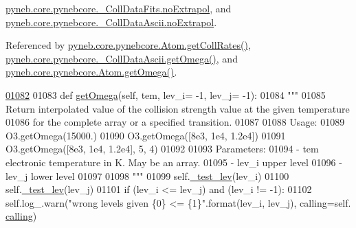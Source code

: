 \hyperlink{pynebcore_8py_source_l00584}{pyneb.\-core.\-pynebcore.\-\_\-\-Coll\-Data\-Fits.\-no\-Extrapol}, and \hyperlink{pynebcore_8py_source_l00935}{pyneb.\-core.\-pynebcore.\-\_\-\-Coll\-Data\-Ascii.\-no\-Extrapol}.



Referenced by \hyperlink{pynebcore_8py_source_l01394}{pyneb.\-core.\-pynebcore.\-Atom.\-get\-Coll\-Rates()}, \hyperlink{pynebcore_8py_source_l01082}{pyneb.\-core.\-pynebcore.\-\_\-\-Coll\-Data\-Ascii.\-get\-Omega()}, and \hyperlink{pynebcore_8py_source_l01324}{pyneb.\-core.\-pynebcore.\-Atom.\-get\-Omega()}.


\begin{DoxyCode}
\hypertarget{classpyneb_1_1core_1_1pynebcore_1_1___coll_data_ascii_l01082}{}\hyperlink{classpyneb_1_1core_1_1pynebcore_1_1___coll_data_ascii_a2f99c08a0f6a46d88b6e09b0a36495c2}{01082} 
01083     \textcolor{keyword}{def }\hyperlink{classpyneb_1_1core_1_1pynebcore_1_1___coll_data_ascii_a2f99c08a0f6a46d88b6e09b0a36495c2}{getOmega}(self, tem, lev\_i= -1, lev\_j= -1):
01084         \textcolor{stringliteral}{"""}
01085 \textcolor{stringliteral}{        Return interpolated value of the collision strength value at the given temperature }
01086 \textcolor{stringliteral}{            for the complete array or a specified transition.}
01087 \textcolor{stringliteral}{}
01088 \textcolor{stringliteral}{        Usage:}
01089 \textcolor{stringliteral}{            O3.getOmega(15000.)}
01090 \textcolor{stringliteral}{            O3.getOmega([8e3, 1e4, 1.2e4])}
01091 \textcolor{stringliteral}{            O3.getOmega([8e3, 1e4, 1.2e4], 5, 4)}
01092 \textcolor{stringliteral}{        }
01093 \textcolor{stringliteral}{        Parameters:}
01094 \textcolor{stringliteral}{            - tem    electronic temperature in K. May be an array.}
01095 \textcolor{stringliteral}{            - lev\_i  upper level}
01096 \textcolor{stringliteral}{            - lev\_j  lower level}
01097 \textcolor{stringliteral}{}
01098 \textcolor{stringliteral}{        """}
01099         self.\hyperlink{classpyneb_1_1core_1_1pynebcore_1_1___coll_data_ascii_ab0aa6c61eca4fb3b526265776caab5b4}{\_test\_lev}(lev\_i)
01100         self.\hyperlink{classpyneb_1_1core_1_1pynebcore_1_1___coll_data_ascii_ab0aa6c61eca4fb3b526265776caab5b4}{\_test\_lev}(lev\_j)
01101         \textcolor{keywordflow}{if} (lev\_i <= lev\_j) \textcolor{keywordflow}{and} (lev\_i != -1):
01102             self.log\_.warn(\textcolor{stringliteral}{"wrong levels given \{0\} <= \{1\}"}.format(lev\_i, lev\_j), calling=self.
      \hyperlink{classpyneb_1_1core_1_1pynebcore_1_1___coll_data_ascii_a08efc5898f4e03a1b7702d85f909e188}{calling})

\end{DoxyCode}
